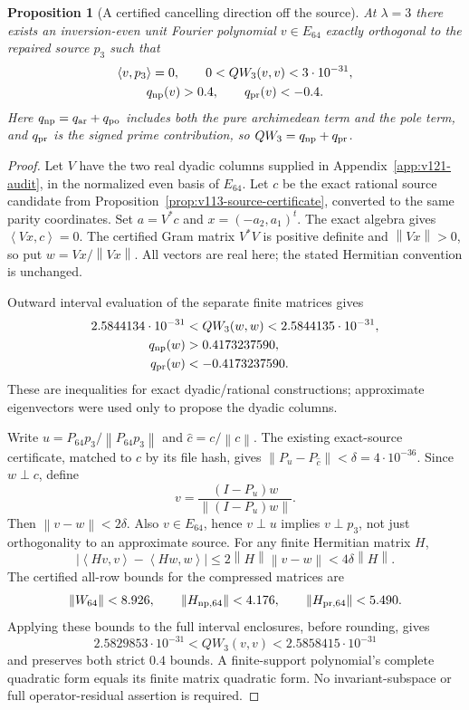 \documentclass[11pt]{article}
\newtheorem{proposition}[theorem]{Proposition}
\theoremstyle{remark}
\newcommand{\norm}[1]{\left\lVert #1\right\rVert}
\newcommand{\ip}[2]{\left\langle #1,#2\right\rangle}
\begin{document}
\begin{proposition}[A certified cancelling direction off the source]
\label{prop:v121-complement-cancellation}
At $\lambda=3$ there exists an inversion-even unit Fourier polynomial
$v\in E_{64}$ exactly orthogonal to the repaired source $p_3$ such that
\begin{equation}\label{eq:v121-complement-cancellation}
 \begin{gathered}
 \ip{v}{p_3}=0,\qquad
 0<QW_3(v,v)<3\cdot10^{-31},\\
 q_{\rm np}(v)>0.4,\qquad q_{\rm pr}(v)<-0.4.
 \end{gathered}
\end{equation}
Here $q_{\rm np}=q_{\rm ar}+q_{\rm po}$ includes both the pure
archimedean term and the pole term, and $q_{\rm pr}$ is the signed
prime contribution, so $QW_3=q_{\rm np}+q_{\rm pr}$.
\end{proposition}
\begin{proof}
Let $V$ have the two real dyadic columns supplied in
Appendix~\ref{app:v121-audit}, in the normalized even basis of $E_{64}$.
Let $c$ be the exact rational source candidate from
Proposition~\ref{prop:v113-source-certificate}, converted to the same
parity coordinates. Set $a=V^*c$ and $x=(-a_2,a_1)^t$. The exact
algebra gives $\ip{Vx}{c}=0$. The certified Gram matrix $V^*V$ is
positive definite and $\norm{Vx}>0$, so put $w=Vx/\norm{Vx}$.
All vectors are real here; the stated Hermitian convention is unchanged.

Outward interval evaluation of the separate finite matrices gives
\[
 \begin{aligned}
 2.5844134\cdot10^{-31}&<QW_3(w,w)<2.5844135\cdot10^{-31},\\
 q_{\rm np}(w)&>0.4173237590,\\
 q_{\rm pr}(w)&<-0.4173237590.
 \end{aligned}
\]
These are inequalities for exact dyadic/rational constructions;
approximate eigenvectors were used only to propose the dyadic columns.

Write $u=P_{64}p_3/\norm{P_{64}p_3}$ and $\widehat c=c/\norm c$.
The existing exact-source certificate, matched to $c$ by its file hash,
gives $\norm{P_u-P_{\widehat c}}<\delta=4\cdot10^{-36}$.
Since $w\perp c$, define
\[
 v=\frac{(I-P_u)w}{\norm{(I-P_u)w}}.
\]
Then $\norm{v-w}<2\delta$. Also $v\in E_{64}$, hence $v\perp u$
implies $v\perp p_3$, not just orthogonality to an approximate source.
For any finite Hermitian matrix $H$,
\[
 |\ip{Hv}{v}-\ip{Hw}{w}|
 \le2\norm H\norm{v-w}<4\delta\norm H.
\]
The certified all-row bounds for the compressed matrices are
\[
 \norm{W_{64}}<8.926,\qquad
 \norm{H_{\rm np,64}}<4.176,\qquad
 \norm{H_{\rm pr,64}}<5.490.
\]
Applying these bounds to the full interval enclosures, before rounding,
gives
\[
 2.5829853\cdot10^{-31}<QW_3(v,v)<2.5858415\cdot10^{-31}
\]
and preserves both strict $0.4$ bounds. A finite-support polynomial's
complete quadratic form equals its finite matrix quadratic form.
No invariant-subspace or full operator-residual assertion is required.
\end{proof}
\end{document}
